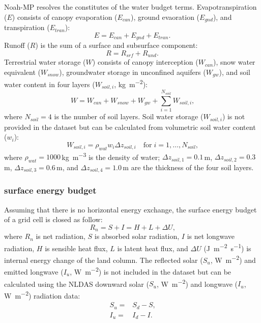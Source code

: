 \documentclass[essd]{copernicus}
\begin{document}
Noah-MP resolves the constitutes of the water budget terms. Evapotranspiration
(\(E\)) consists of canopy evaporation (\(E_{can}\)), ground evaoration
(\(E_{gnd}\)), and transpiration (\(E_{tran}\)):
\begin{equation}
  E = E_{can} + E_{gnd} + E_{tran} \text{.}
\end{equation}
Runoff (\(R\)) is the sum of a surface and subsurface component:
\begin{equation}
  R = R_{srf} + R_{und} \text{.}
\end{equation}
Terrestrial water storage (\(W\)) consists of canopy interception (\(W_{can}\)),
snow water equivalent (\(W_{snow}\)), groundwater storage in unconfined aquifers
(\(W_{gw}\)), and soil water content in four layers (\(W_{soil,i}\),
\si{kg~m^{-2}}):
\begin{equation}
  W = W_{can} + W_{snow} + W_{gw} + \sum_{i=1}^{N_{soil}} W_{soil,i} \text{,}
\end{equation}
where \(N_{soil} = 4\) is the number of soil layers.  Soil water storage
(\(W_{soil,i}\)) is not provided in the dataset but can be calculated from
volumetric soil water content (\(w_{i}\)):
\begin{equation}
  W_{soil,i} = \rho_{wat} w_i \Delta z_{soil,i}
  \quad \text{for} \; i = 1,\dots,N_{soil}
  \label{eq:soil-vmc} \text{,}
\end{equation}
where \(\rho_{wat}=1000\)\,\si{kg~m^{-3}} is the density of water; \(\Delta
z_{soil,1}=0.1\)\,\si{m}, \(\Delta z_{soil,2}=0.3\)\,\si{m}, \(\Delta
z_{soil,3}=0.6\)\,\si{m}, and \(\Delta z_{soil,4}=1.0\)\,\si{m} are the
thickness of the four soil layers.

\subsubsection{surface energy budget}

Assuming that there is no horizontal energy exchange, the surface energy budget
of a grid cell is closed as follow:
\begin{equation}
  R_n = S + I = H + L + \Delta U \text{,} \label{eq:energy-balance}
\end{equation}
where \(R_n\) is net radiation, \(S\) is absorbed solar radiation, \(I\) is net
longwave radiation, \(H\) is sensible heat flux, \(L\) is latent heat flux, and
\(\Delta U\) (\si{J~m^{-2}~s^{-1}}) is internal energy change of the land
column. The reflected solar (\(S_u\), \si{W~m^{-2}}) and emitted longwave
(\(I_u\), \si{W~m^{-2}}) is not included in the dataset but can be calculated
using the NLDAS downward solar (\(S_u\), \si{W~m^{-2}}) and
longwave (\(I_u\), \si{W~m^{-2}}) radiation data:
\begin{align}
  S_u = & S_d - S \text{,} \\
  I_u = & I_d - I \text{.}
\end{align}
\end{document}
